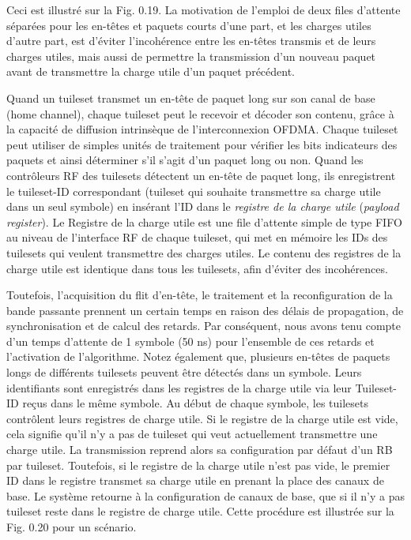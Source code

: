 Ceci est illustré sur la Fig. 0.19. La motivation de l’emploi de deux files d'attente séparées pour les en-têtes et paquets courts d’une part, et les charges utiles d’autre part, est d'éviter l'incohérence entre les en-têtes transmis et de leurs charges utiles, mais aussi de permettre la transmission d'un nouveau paquet avant de transmettre la charge utile d'un paquet précédent. 

Quand un tuileset transmet un en-tête de paquet long sur son canal de base (home channel), chaque tuileset peut le recevoir et décoder son contenu, grâce à la capacité de diffusion intrinsèque de l'interconnexion OFDMA. Chaque tuileset peut utiliser de simples unités de traitement pour vérifier les bits indicateurs des paquets et ainsi déterminer s’il s’agit d’un paquet long ou non. Quand les contrôleurs RF des tuilesets détectent un en-tête de paquet long, ils enregistrent le tuileset-ID correspondant (tuileset qui souhaite transmettre sa charge utile dans un seul symbole) en insérant l'ID dans le \textit{registre de la charge utile} (\textit{payload register}). Le Registre de la charge utile est une file d'attente simple de type FIFO au niveau de l'interface RF de chaque tuileset, qui met en mémoire les IDs des tuilesets qui veulent transmettre des charges utiles. Le contenu des registres de la charge utile est identique dans tous les tuilesets, afin d'éviter des incohérences.

Toutefois, l'acquisition du flit d’en-tête, le traitement et la reconfiguration de la bande passante prennent un certain  temps en raison des délais de propagation, de synchronisation et de calcul des retards. Par conséquent, nous avons tenu compte d’un temps d'attente de 1 symbole (50 ns) pour l’ensemble de ces retards et l'activation de l'algorithme. Notez également que, plusieurs en-têtes de paquets longs de différents tuilesets peuvent être détectés dans un symbole. Leurs identifiants sont enregistrés dans les registres de la charge utile via leur Tuileset-ID reçus dans le même symbole. Au début de chaque symbole, les tuilesets contrôlent leurs registres de charge utile. Si le registre de la charge utile est vide, cela signifie qu'il n'y a pas de tuileset qui veut actuellement transmettre une charge utile. La transmission reprend alors sa configuration par défaut d’un RB par tuileset.
Toutefois, si le registre de la charge utile n'est pas vide, le premier ID dans le registre transmet sa charge utile en prenant la place des canaux de base. Le système retourne à la configuration de canaux de base, que si il n'y a pas tuileset reste dans le registre de charge utile. Cette procédure est illustrée sur la Fig. 0.20 pour un scénario.

